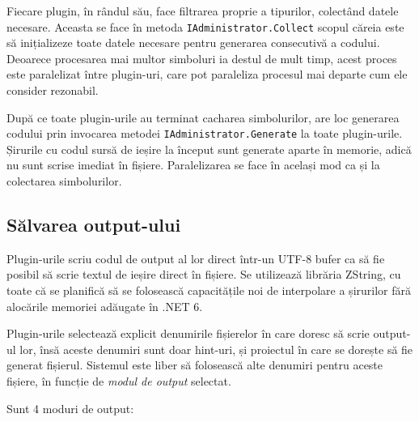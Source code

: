 \documentclass[a4paper,12pt]{report}
\begin{document}
Fiecare plugin, în rândul său, face filtrarea proprie a tipurilor, colectând datele necesare.
Aceasta se face în metoda \texttt{IAdministrator.Collect} scopul căreia este să inițializeze toate datele necesare pentru generarea consecutivă a codului.
Deoarece procesarea mai multor simboluri ia destul de mult timp, acest proces este paralelizat între plugin-uri, care pot paraleliza procesul mai departe cum ele consider rezonabil.

După ce toate plugin-urile au terminat cacharea simbolurilor, are loc generarea codului prin invocarea metodei \texttt{IAdministrator.Generate} la toate plugin-urile.
Șirurile cu codul sursă de ieșire la început sunt generate aparte în memorie, adică nu sunt scrise imediat în fișiere.
Paralelizarea se face în același mod ca și la colectarea simbolurilor.

\subsection{Sălvarea output-ului}

Plugin-urile scriu codul de output al lor direct într-un UTF-8 bufer ca să fie posibil să scrie textul de ieșire direct în fișiere.
Se utilizează librăria ZString\cite{zstring_github}, cu toate că se planifică să se folosească capacitățile noi de interpolare a șirurilor fără alocările memoriei adăugate în .NET 6.\cite{string_interpolation_csharp_10}

Plugin-urile selectează explicit denumirile fișierelor în care doresc să scrie output-ul lor, însă aceste denumiri sunt doar hint-uri, și proiectul în care se dorește să fie generat fișierul.
Sistemul este liber să folosească alte denumiri pentru aceste fișiere, în funcție de \emph{modul de output} selectat.

Sunt 4 moduri de output:
\end{document}
